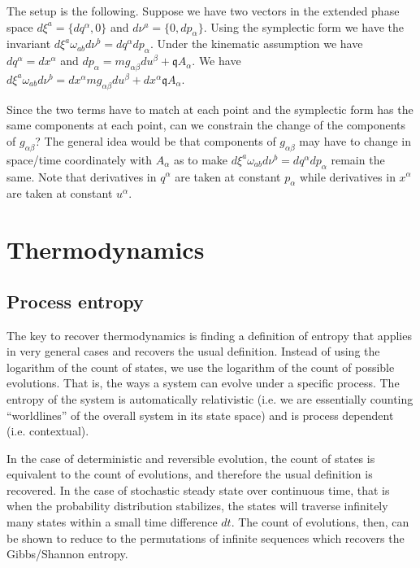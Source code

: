\documentclass[11pt,letterpaper,fleqn]{memoir} %
\begin{document}
The setup is the following. Suppose we have two vectors in the extended phase space $d\xi^a = \{dq^\alpha, 0\}$ and $d\nu^a = \{0, dp_\alpha\}$. Using the symplectic form we have the invariant $d\xi^a \omega_{ab}d\nu^b = dq^\alpha dp_\alpha$. Under the kinematic assumption we have $dq^\alpha = dx^\alpha$ and $dp_\alpha = mg_{\alpha\beta}du^\beta + \mathfrak{q} A_\alpha$. We have $d\xi^a \omega_{ab}d\nu^b = dx^\alpha m g_{\alpha\beta} du^\beta + dx^\alpha \mathfrak{q} A_\alpha$.

Since the two terms have to match at each point and the symplectic form has the same components at each point, can we constrain the change of the components of $g_{\alpha\beta}$? The general idea would be that components of $g_{\alpha\beta}$ may have to change in space/time coordinately with $A_\alpha$ as to make $d\xi^a \omega_{ab}d\nu^b = dq^\alpha dp_\alpha$ remain the same. Note that derivatives in $q^\alpha$ are taken at constant $p_\alpha$ while derivatives in $x^\alpha$ are taken at constant $u^\alpha$.

\section{Thermodynamics}

\subsection{Process entropy}

The key to recover thermodynamics is finding a definition of entropy that applies in very general cases and recovers the usual definition. Instead of using the logarithm of the count of states, we use the logarithm of the count of possible evolutions. That is, the ways a system can evolve under a specific process. The entropy of the system is automatically relativistic (i.e. we are essentially counting ``worldlines'' of the overall system in its state space) and is process dependent (i.e. contextual).

In the case of deterministic and reversible evolution, the count of states is equivalent to the count of evolutions, and therefore the usual definition is recovered. In the case of stochastic steady state over continuous time, that is when the probability distribution stabilizes, the states will traverse infinitely many states within a small time difference $dt$. The count of evolutions, then, can be shown to reduce to the permutations of infinite sequences which recovers the Gibbs/Shannon entropy.
\end{document}
